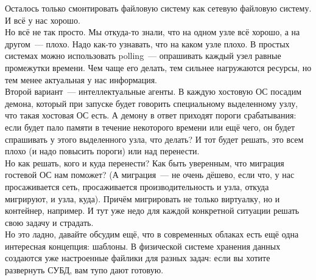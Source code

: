 \documentclass{article}
\begin{document}
    Осталось только смонтировать файловую систему как сетевую файловую систему. И всё у нас хорошо.\\
    Но всё не так просто. Мы откуда-то знали, что на одном узле всё хорошо, а на другом~--- плохо. Надо как-то узнавать, что на каком узле плохо. В простых системах можно использовать polling~--- опрашивать каждый узел равные промежутки времени. Чем чаще его делать, тем сильнее нагружаются ресурсы, но тем менее актуальная у нас информация.\\
    Второй вариант~--- интеллектуальные агенты. В каждую хостовую ОС посадим демона, который при запуске будет говорить специальному выделенному узлу, что такая хостовая ОС есть. А демону в ответ приходят пороги срабатывания: если будет пало памяти в течение некоторого времени или ещё чего, он будет спрашивать у этого выделенного узла, что делать? И тот будет решать, это всем плохо (и надо повысить пороги) или над перенести.\\
    Но как решать, кого и куда перенести? Как быть уверенным, что миграция гостевой ОС нам поможет? (А миграция~--- не очень дёшево, если что, у нас просаживается сеть, просаживается производительность и узла, откуда мигрируют, и узла, куда). Причём мигрировать не только виртуалку, но и контейнер, например. И тут уже недо для каждой конкретной ситуации решать свою задачу и страдать.\\
    Но это ладно, давайте обсудим ещё, что в современных облаках есть ещё одна интересная концепция: шаблоны. В физической системе хранения данных создаются уже настроенные файлики для разных задач: если вы хотите развернуть СУБД, вам тупо дают готовую.
\end{document}
